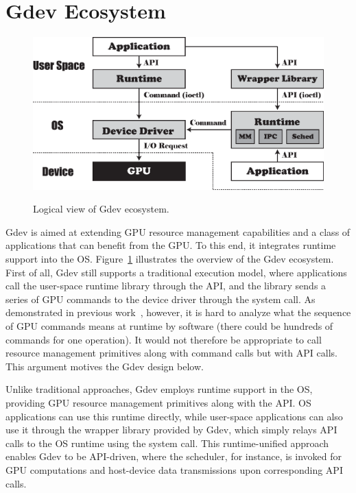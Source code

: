 \section{Gdev Ecosystem}
\label{sec:ecosystem}

\begin{figure}[t]
 \begin{center}
  \includegraphics[width=0.95\hsize]{eps/gdev.eps}\\
  \caption{Logical view of Gdev ecosystem.}
  \label{fig:gdev}
 \end{center}
 \vspace{-1em}
\end{figure}

Gdev is aimed at extending GPU resource management capabilities and a
class of applications that can benefit from the GPU.
To this end, it integrates runtime support into the OS.
Figure~\ref{fig:gdev} illustrates the overview of the Gdev ecosystem.
First of all, Gdev still supports a traditional execution model, where
applications call the user-space runtime library through the API, and
the library sends a series of GPU commands to the device driver through
the system call.
As demonstrated in previous work~\cite{Kato_ATC11}, however, it is hard
to analyze what the sequence of GPU commands means at runtime by
software (there could be hundreds of commands for one operation).
It would not therefore be appropriate to call resource management
primitives along with command calls but with API calls.
This argument motives the Gdev design below.

Unlike traditional approaches, Gdev employs runtime support in
the OS, providing GPU resource management primitives along with the API.
OS applications can use this runtime directly, while user-space
applications can also use it through the wrapper library provided by
Gdev, which simply relays API calls to the OS runtime using the system
call.
This runtime-unified approach enables Gdev to be API-driven, where the
scheduler, for instance, is invoked for GPU computations and host-device
data transmissions upon corresponding API calls.

